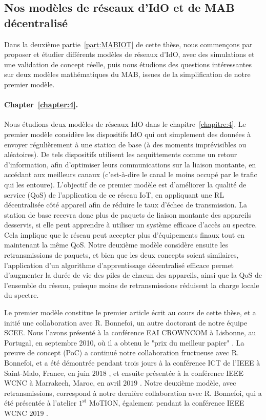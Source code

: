 \begin{resume_fr}

\subsection*{Nos modèles de réseaux d'IdO et de MAB décentralisé}

Dans la deuxième partie~\ref{part:MABIOT} de cette thèse, nous commençons par proposer et étudier différents modèles de réseaux d'IdO, avec des simulations et une validation de concept réelle, puis nous étudions des questions intéressantes sur deux modèles mathématiques du MAB, issues de la simplification de notre premier modèle.


\paragraph{Chapter~\ref{chapter:4}.}
%
Nous étudions deux modèles de réseaux IdO dans le chapitre~\ref{chapitre:4}.
Le premier modèle considère les dispositifs IdO qui ont simplement des données à envoyer régulièrement à une station de base (à des moments imprévisibles ou aléatoires).
De tels dispositifs utilisent les acquittements comme un retour d'information, afin d'optimiser leurs communications sur la liaison montante, en accédant aux meilleurs canaux (c'est-à-dire le canal le moins occupé par le trafic qui les entoure).
L'objectif de ce premier modèle est d'améliorer la qualité de service (QoS) de l'application de ce réseau IoT, en appliquant une RL décentralisée côté appareil afin de réduire le taux d'échec de transmission.
La station de base recevra donc plus de paquets de liaison montante des appareils desservis, si elle peut apprendre à utiliser un système efficace d'accès au spectre.
Cela implique que le réseau peut accepter plus d'équipements finaux tout en maintenant la même QoS.
%
Notre deuxième modèle considère ensuite les retransmissions de paquets, et bien que les deux concepts soient similaires, l'application d'un algorithme d'apprentissage décentralisé efficace permet d'augmenter la durée de vie des piles de chacun des appareils, ainsi que la QoS de l'ensemble du réseau, puisque moins de retransmissions réduisent la charge locale du spectre.

Le premier modèle constitue le premier article écrit au cours de cette thèse, et a initié une collaboration avec R. Bonnefoi, un autre doctorant de notre équipe SCEE.
Nous l'avons présenté à la conférence EAI CROWNCOM à Lisbonne, au Portugal, en septembre 2010, où il a obtenu le "prix du meilleur papier" \cite{Bonnefoi17}.
%
La preuve de concept (PoC) a continué notre collaboration fructueuse avec R. Bonnefoi, et a été démontrée pendant trois jours à la conférence ICT de l'IEEE à Saint-Malo, France, en juin $2018$ \cite{Besson2018ICT}, et ensuite présentée à la conférence IEEE WCNC à Marrakech, Maroc, en avril $2019$ \cite{Besson2019WCNC}.
%
Notre deuxième modèle, avec retransmissions, correspond à notre dernière collaboration avec R. Bonnefoi, qui a été présentée à l'atelier $1^{\text{st}}$ MoTION, également pendant la conférence IEEE WCNC $2019$ \cite{Bonnefoi2019WCNC}.



\end{resume_fr}
